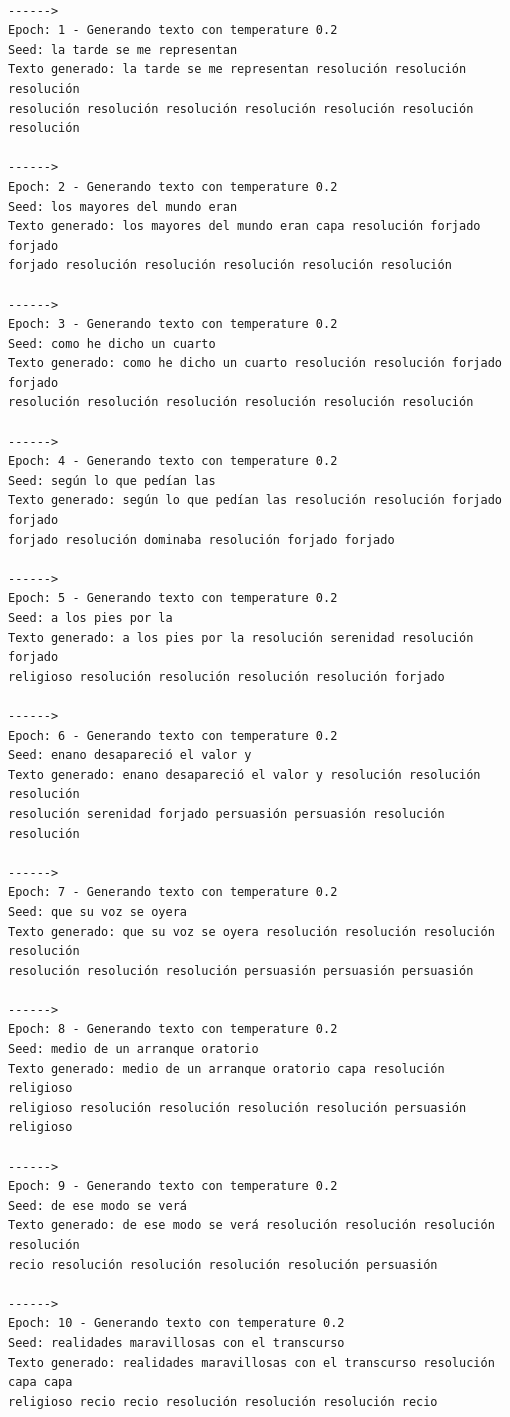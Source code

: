 \documentclass[11pt]{article}
\begin{document}
\begin{tcolorbox}[breakable, size=fbox, boxrule=1pt, pad at break*=1mm,colback=cellbackground, colframe=cellborder]
    \begin{Verbatim}[commandchars=\\\{\}]
        
------> 
Epoch: 1 - Generando texto con temperature 0.2
Seed: la tarde se me representan
Texto generado: la tarde se me representan resolución resolución resolución
resolución resolución resolución resolución resolución resolución resolución

------> 
Epoch: 2 - Generando texto con temperature 0.2
Seed: los mayores del mundo eran
Texto generado: los mayores del mundo eran capa resolución forjado forjado
forjado resolución resolución resolución resolución resolución

------> 
Epoch: 3 - Generando texto con temperature 0.2
Seed: como he dicho un cuarto
Texto generado: como he dicho un cuarto resolución resolución forjado forjado
resolución resolución resolución resolución resolución resolución

------> 
Epoch: 4 - Generando texto con temperature 0.2
Seed: según lo que pedían las
Texto generado: según lo que pedían las resolución resolución forjado forjado
forjado resolución dominaba resolución forjado forjado

------> 
Epoch: 5 - Generando texto con temperature 0.2
Seed: a los pies por la
Texto generado: a los pies por la resolución serenidad resolución forjado
religioso resolución resolución resolución resolución forjado

------> 
Epoch: 6 - Generando texto con temperature 0.2
Seed: enano desapareció el valor y
Texto generado: enano desapareció el valor y resolución resolución resolución
resolución serenidad forjado persuasión persuasión resolución resolución

------> 
Epoch: 7 - Generando texto con temperature 0.2
Seed: que su voz se oyera
Texto generado: que su voz se oyera resolución resolución resolución resolución
resolución resolución resolución persuasión persuasión persuasión

------> 
Epoch: 8 - Generando texto con temperature 0.2
Seed: medio de un arranque oratorio
Texto generado: medio de un arranque oratorio capa resolución religioso
religioso resolución resolución resolución resolución persuasión religioso

------> 
Epoch: 9 - Generando texto con temperature 0.2
Seed: de ese modo se verá
Texto generado: de ese modo se verá resolución resolución resolución resolución
recio resolución resolución resolución resolución persuasión

------> 
Epoch: 10 - Generando texto con temperature 0.2
Seed: realidades maravillosas con el transcurso
Texto generado: realidades maravillosas con el transcurso resolución capa capa
religioso recio recio resolución resolución resolución recio

    \end{Verbatim}
    \end{tcolorbox}
\end{document}

